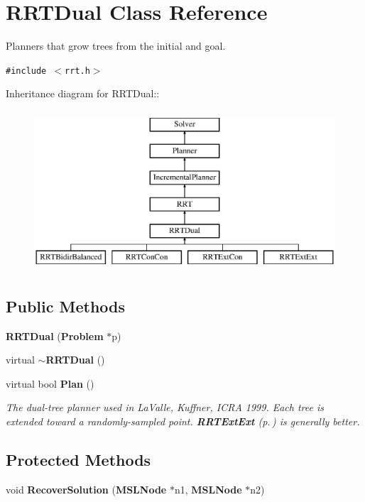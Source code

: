 \section{RRTDual  Class Reference}
\label{classRRTDual}
Planners that grow trees from the initial and goal. 


{\tt \#include $<$rrt.h$>$}

Inheritance diagram for RRTDual::\begin{figure}[H]
\begin{center}
\leavevmode
\includegraphics[height=6cm]{classRRTDual}
\end{center}
\end{figure}
\subsection*{Public Methods}
\begin{CompactItemize}
\item 
{\bf RRTDual} ({\bf Problem} $\ast$p)
\item 
virtual {\bf $\sim$RRTDual} ()
\item 
virtual bool {\bf Plan} ()
\begin{CompactList}\small\item\em The dual-tree planner used in La\-Valle, Kuffner, ICRA 1999. Each tree is extended toward a randomly-sampled point. {\bf RRTExt\-Ext} {\rm (p.\,\pageref{classRRTExtExt})} is generally better.\item\end{CompactList}\end{CompactItemize}
\subsection*{Protected Methods}
\begin{CompactItemize}
\item 
void {\bf Recover\-Solution} ({\bf MSLNode} $\ast$n1, {\bf MSLNode} $\ast$n2)
\end{CompactItemize}



